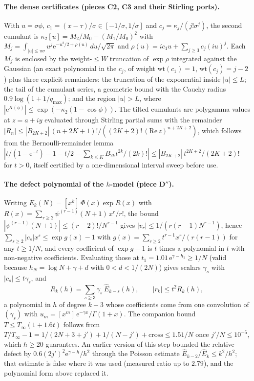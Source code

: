 \documentclass[12pt]{article}
\newcommand{\ee}{\mathrm{e}}
\begin{document}
\paragraph{The dense certificates (pieces C2, C3 and their Stirling ports).}
With $u = \sigma\phi$, $c_1 = (x-\tau)/\sigma \in [-1/\sigma, 1/\sigma]$ and $c_j = \kappa_j/(j!\sigma^j)$, the second cumulant is $\kappa_2[u] = M_2/M_0 - (M_1/M_0)^2$ with $M_j = \int_{|u|\le\pi\sigma} u^j \ee^{-u^2/2+\rho(u)}\,du/\sqrt{2\pi}$ and $\rho(u) = ic_1u + \sum_{j\ge3}c_j(iu)^j$. Each $M_j$ is enclosed by the weight-$\le W$ truncation of $\exp\rho$ integrated against the Gaussian (an exact polynomial in the $c_j$, of weight $\mathrm{wt}(c_1)=1$, $\mathrm{wt}(c_j)=j-2$) plus three explicit remainders: the truncation of the exponential inside $|u|\le L$; the tail of the cumulant series, a geometric bound with the Cauchy radius $0.9\log(1+1/q_{\max})$; and the region $|u|>L$, where $|\ee^{K(\phi)}| \le \exp(-\kappa_2(1-\cos\phi))$. The tilted cumulants are polygamma values at $z = a+iy$ evaluated through Stirling partial sums with the remainder $|R_n| \le |B_{2K+2}|\,(n+2K+1)!/((2K+2)!\,(\mathrm{Re}\,z)^{n+2K+2})$, which follows from the Bernoulli-remainder lemma $|t/(1-\ee^{-t}) - 1 - t/2 - \sum_{k\le K}B_{2k}t^{2k}/(2k)!| \le |B_{2K+2}|\,t^{2K+2}/(2K+2)!$ for $t>0$, itself certified by a one-dimensional interval sweep before use.

\paragraph{The defect polynomial of the $h$-model (piece D$''$).}
Writing $E_k(N) = [x^k]\,\Phi(x)\exp R(x)$ with $R(x) = \sum_{r\ge2}\psi^{(r-1)}(N+1)\,x^r/r!$, the bound $|\psi^{(r-1)}(N+1)| \le (r-2)!/N^{r-1}$ gives $|v_r| \le 1/(r(r-1)N^{r-1})$, hence $\sum_{s\ge2}|c_s|x^s \le \exp g(x) - 1$ with $g(x) = \sum_{r\ge2} t^{r-1}x^r/(r(r-1))$ for any $t\ge1/N$, and every coefficient of $\exp g - 1$ is $t$ times a polynomial in $t$ with non-negative coefficients. Evaluating those at $t_1 = 1.01\,\ee^{\gamma-h_1} \ge 1/N$ (valid because $h_N = \log N + \gamma + d$ with $0<d<1/(2N)$) gives scalars $\gamma_s$ with $|c_s| \le t\gamma_s$, and
\[
R_k(h) = \sum_{s\ge3}\gamma_s\,\hat E_{k-s}(h), \qquad |r_k| \le t^2R_k(h),
\]
a polynomial in $h$ of degree $k-3$ whose coefficients come from one convolution of $(\gamma_s)$ with $u_m = [x^m]\,\ee^{-\gamma x}/\Gamma(1+x)$. The companion bound $T \le T_\infty(1+1.6t)$ follows from $T/T_\infty - 1 = 1/(2N+3+j') + 1/(N-j') + \text{cross} \le 1.51/N$ once $j'/N \le 10^{-5}$, which $h\ge20$ guarantees. An earlier version of this step bounded the relative defect by $0.6(2j')^2\ee^{\gamma-h}/h^2$ through the Poisson estimate $\hat E_{k-2}/\hat E_k \le k^2/h^2$; that estimate is false where it was used (measured ratio up to $2.79$), and the polynomial form above replaced it.
\end{document}
